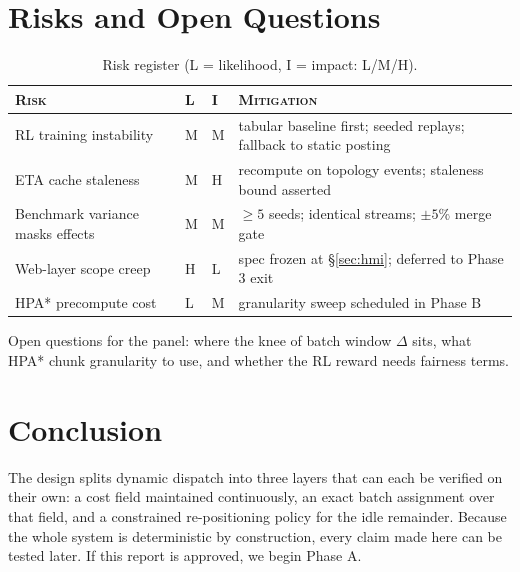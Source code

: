 \documentclass[11pt,a4paper]{article}
\theoremstyle{spaceddef}
\theoremstyle{spacedplain}
\begin{document}
\section{Risks and Open Questions}
\begin{table}[H]\centering\small
\begin{tabular}{@{}p{4.4cm}llp{5.6cm}@{}}
\toprule
\textsc{Risk} & \textsc{L} & \textsc{I} & \textsc{Mitigation} \\
\midrule
RL training instability & M & M & tabular baseline first; seeded replays; fallback to static posting \\
ETA cache staleness & M & H & recompute on topology events; staleness bound asserted \\
Benchmark variance masks effects & M & M & $\ge5$ seeds; identical streams; $\pm5\%$ merge gate \\
Web-layer scope creep & H & L & spec frozen at \S\ref{sec:hmi}; deferred to Phase 3 exit \\
HPA* precompute cost & L & M & granularity sweep scheduled in Phase B \\
\bottomrule
\end{tabular}
\caption{Risk register (L = likelihood, I = impact: L/M/H).}
\end{table}
Open questions for the panel: where the knee of batch window $\Delta$ sits, what
HPA* chunk granularity to use, and whether the RL reward needs fairness terms.

\section{Conclusion}
The design splits dynamic dispatch into three layers that can each be verified on
their own: a cost field maintained continuously, an exact batch assignment over
that field, and a constrained re-positioning policy for the idle remainder.
Because the whole system is deterministic by construction, every claim made here
can be tested later. If this report is approved, we begin Phase A.
\end{document}
